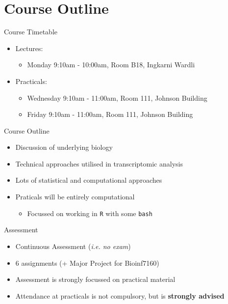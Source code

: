 \documentclass[11pt]{beamer}
\begin{document}
\section{Course Outline}


\begin{frame}{Course Timetable}

	\begin{itemize}
		\item Lectures:
		\begin{itemize}
			\item Monday 9:10am - 10:00am, Room B18, Ingkarni Wardli
\end{itemize}		 
		\item Practicals:
		\begin{itemize}
			\item Wednesday 9:10am - 11:00am, Room 111, Johnson Building
			\item Friday 9:10am - 11:00am, Room 111, Johnson Building
		\end{itemize}
	\end{itemize}

\end{frame}

\begin{frame}{Course Outline}

	\begin{itemize}
		\item Discussion of underlying biology
		\item Technical approaches utilised in transcriptomic analysis
		\item Lots of statistical and computational approaches
		\item Praticals will be entirely computational
		\begin{itemize}
			\item Focussed on working in \texttt{R} with some \texttt{bash}
		\end{itemize}
	\end{itemize}

\end{frame}

\begin{frame}{Assessment}

	\begin{itemize}
		\item Continuous Assessment (\textit{i.e. no exam})
		\item 6 assignments (+ Major Project for Bioinf7160)
		\item Assessment is strongly focussed on practical material
		\item Attendance at practicals is not compulsory, but is \textbf{strongly advised}
	\end{itemize}

\end{frame}
\end{document}

